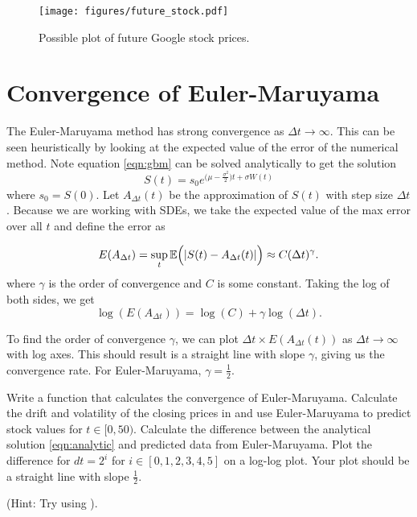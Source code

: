 \begin{figure}
\texttt{[image: figures/future\_stock.pdf]}
\caption{Possible plot of future Google stock prices.}
\label{fig:stock}
\end{figure}

\section*{Convergence of Euler-Maruyama}

The Euler-Maruyama method has strong convergence as $\Delta t\rightarrow\infty$.
This can be seen heuristically by looking at the expected value of the error of the numerical method.
Note equation \ref{eqn:gbm} can be solved analytically to get the solution
\begin{equation}
S(t)=s_0e^{\bigl(\mu-\frac{\sigma^2}{2}\bigr)t+\sigma W(t)}
\label{eqn:analytic}
\end{equation}
where $s_0=S(0)$.
Let $A_{\Delta t}(t)$ be the approximation of $S(t)$ with step size $\Delta t$.
Because we are working with SDEs, we take the expected value of the max error over all $t$ and define the error as

\begin{equation}
E(A_{\Delta t})=\sup_t\mathbb{E}\Bigl(|S(t)-A_{\Delta t}(t)|\Bigr)\approx C(\Delta t)^\gamma.
\end{equation}
where $\gamma$ is the order of convergence and $C$ is some constant.
Taking the log of both sides, we get
\begin{equation}
\log(E(A_{\Delta t}))=\log(C)+\gamma\log(\Delta t).
\end{equation}

To find the order of convergence $\gamma$, we can plot $\Delta t\times E(A_{\Delta t}(t))$ as $\Delta t\rightarrow\infty$ with log axes.
This should result is a straight line with slope $\gamma$, giving us the convergence rate.
For Euler-Maruyama, $\gamma=\frac{1}{2}$.

\begin{problem}
Write a function  that calculates the convergence of Euler-Maruyama.
Calculate the drift and volatility of the closing prices in  and use Euler-Maruyama to predict stock values for $t\in[0,50)$.
Calculate the difference between the analytical solution \ref{eqn:analytic} and predicted data from Euler-Maruyama.
Plot the difference for $dt=2^i$ for $i\in[0,1,2,3,4,5]$ on a log-log plot.
Your plot should be a straight line with slope $\frac{1}{2}$.

(Hint: Try using ).
\end{problem}
